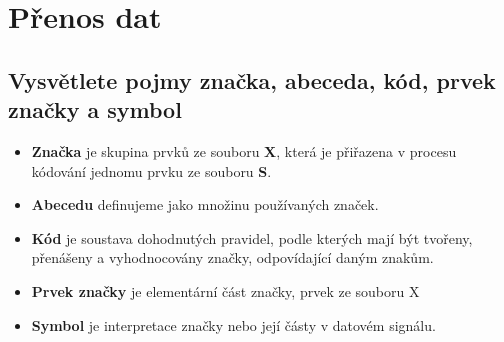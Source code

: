 \clearpage
\section{Přenos dat}
\subsection{Vysvětlete pojmy značka, abeceda, kód, prvek značky a symbol}
\begin{itemize}
    \item \textbf{Značka} je skupina prvků ze souboru \textbf{X}, která je přiřazena v procesu kódování jednomu prvku ze souboru \textbf{S}.
    \item \textbf{Abecedu} definujeme jako množinu používaných značek.
    \item \textbf{Kód} je soustava dohodnutých pravidel, podle kterých mají být tvořeny, přenášeny a vyhodnocovány značky, odpovídající daným znakům.
    \item \textbf{Prvek značky} je elementární část značky, prvek ze souboru X
    \item \textbf{Symbol} je interpretace značky nebo její částy v datovém signálu.
\end{itemize}

